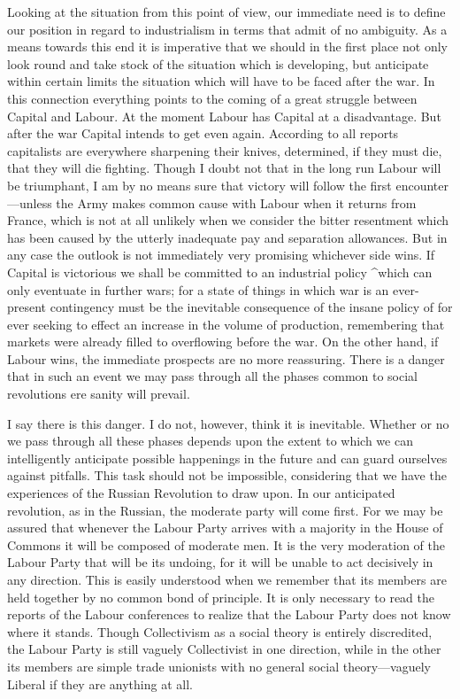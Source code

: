 \documentclass{book}
\begin{document}
Looking at the situation from this point of view, our immediate need is to define our position in regard to industrialism in terms that admit of no ambiguity. As a means towards this end it is imperative that we should in the first place not only look round and take stock of the situation which is developing, but anticipate within certain limits the situation which will have to be faced after the war. In this connection everything points to the coming of a great struggle between Capital and Labour. At the moment Labour has Capital at a disadvantage. But after the war Capital intends to get even again. According to all reports capitalists are everywhere sharpening their knives, determined, if they must die, that they will die fighting. Though I doubt not that in the long run Labour will be triumphant, I am by no means sure that victory will follow the first encounter—unless the Army makes common cause with Labour when it returns from France, which is not at all unlikely when we consider the bitter resentment which has been caused by the utterly inadequate pay and separation allowances. But in any case the outlook is not immediately very promising whichever side wins. If Capital is victorious we shall be committed to an industrial policy \textasciicircum{}which can only eventuate in further wars; for a state of things in which war is an ever-present contingency must be the inevitable consequence of the insane policy of for ever seeking to effect an increase in the volume of production, remembering that markets were already filled to overflowing before the war. On the other hand, if Labour wins, the immediate prospects are no more reassuring. There is a danger that in such an event we may pass through all the phases common to social revolutions ere sanity will prevail.

I say there is this danger. I do not, however, think it is inevitable. Whether or no we pass through all these phases depends upon the extent to which we can intelligently anticipate possible happenings in the future and can guard ourselves against pitfalls. This task should not be impossible, considering that we have the experiences of the Russian Revolution to draw upon. In our anticipated revolution, as in the Russian, the moderate party will come first. For we may be assured that whenever the Labour Party arrives with a majority in the House of Commons it will be composed of moderate men. It is the very moderation of the Labour Party that will be its undoing, for it will be unable to act decisively in any direction. This is easily understood when we remember that its members are held together by no common bond of principle. It is only necessary to read the reports of the Labour conferences to realize that the Labour Party does not know where it stands. Though Collectivism as a social theory is entirely discredited, the Labour Party is still vaguely Collectivist in one direction, while in the other its members are simple trade unionists with no general social theory—vaguely Liberal if they are anything at all.
\end{document}
